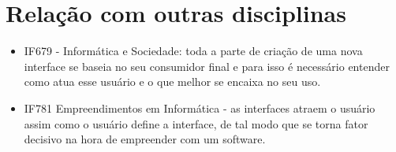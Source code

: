 \documentclass[10pt]{article}
\begin{document}
\section{Relação com outras disciplinas}
\begin{itemize}
\item IF679 - Informática e Sociedade: toda a parte de criação de uma nova interface se baseia no seu consumidor final e para isso é necessário entender como atua esse usuário e o que melhor se encaixa no seu uso. \cite{br-ie}
\item IF781 Empreendimentos em Informática - as interfaces atraem o usuário assim como o usuário define a interface, de tal modo que se torna fator decisivo na hora de empreender com um software. \cite{repositorioufsc}
\end{itemize}


\end{document}
